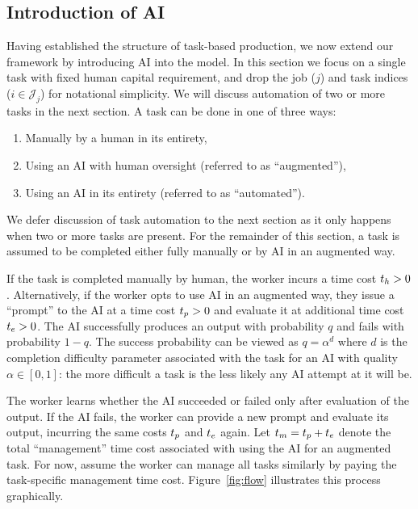 \documentclass{article}
\theoremstyle{plain}
\theoremstyle{plain}
\begin{document}
\subsection{Introduction of AI}
Having established the structure of task-based production, we now extend our framework by introducing AI into the model.
In this section we focus on a single task with fixed human capital requirement, and drop the job ($j$) and task indices ($i \in \mathcal{J}_j$) for notational simplicity.
We will discuss automation of two or more tasks in the next section.
A task can be done in one of three ways:
\begin{enumerate}
\item Manually by a human in its entirety, 
\item Using an AI with human oversight (referred to as ``augmented''),
\item Using an AI in its entirety (referred to as ``automated'').
\end{enumerate}
We defer discussion of task automation to the next section as it only happens when two or more tasks are present.
For the remainder of this section, a task is assumed to be completed either fully manually or by AI in an augmented way.

If the task is completed manually by human, the worker incurs a time cost $t_{h} > 0$.
Alternatively, if the worker opts to use AI in an augmented way, they issue a ``prompt'' to the AI at a time cost $t_{p} > 0$ and evaluate it at additional time cost $t_{e} > 0$.
The AI successfully produces an output with probability $q$ and fails with probability $1-q$. 
The success probability can be viewed as $q=\alpha^d$ where $d$ is the completion difficulty parameter associated with the task for an AI with quality $\alpha \in [0,1]$: the more difficult a task is the less likely any AI attempt at it will be.

The worker learns whether the AI succeeded or failed only after evaluation of the output.
If the AI fails, the worker can provide a new prompt and evaluate its output, incurring the same costs $t_{p}$ and $t_{e}$ again.
Let $t_{m} = t_{p} + t_{e}$ denote the total ``management'' time cost associated with using the AI for an augmented task.
For now, assume the worker can manage all tasks similarly by paying the task-specific management time cost.
Figure~\ref{fig:flow} illustrates this process graphically.
\end{document}
